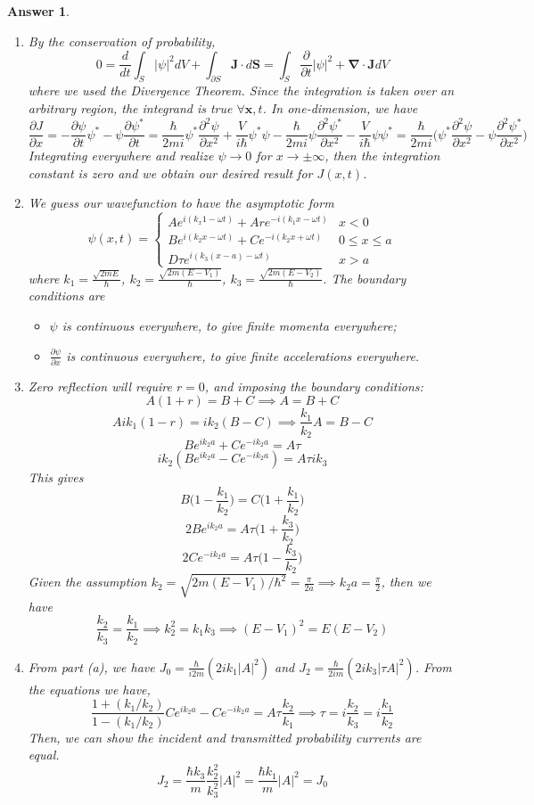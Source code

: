 \documentclass[a4paper]{article}
\newtheorem{ans}{Answer}[subsection]
\theoremstyle{new}
\begin{document}
\begin{ans}\leavevmode
\begin{enumerate}[label=(\alph*)]
\item By the conservation of probability,
$$0=\frac{d}{dt}\int_S|\psi|^2dV+\int_{\partial S}\mathbf{J}\cdot d\mathbf{S}=\int_S\frac{\partial}{\partial t}|\psi|^2+\boldsymbol{\nabla}\cdot\mathbf{J}dV$$
where we used the Divergence Theorem. Since the integration is taken over an arbitrary region, the integrand is true $\forall\mathbf{x},t$. In one-dimension, we have
$$\frac{\partial J}{\partial x}=-\frac{\partial\psi}{\partial t}\psi^*-\psi\frac{\partial\psi^*}{\partial t}=\frac{\hbar}{2mi}\psi^*\frac{\partial^2\psi}{\partial x^2}+\frac{V}{i\hbar}\psi^*\psi-\frac{\hbar}{2mi}\psi\frac{\partial^2\psi^*}{\partial x^2}-\frac{V}{i\hbar}\psi\psi^*=\frac{\hbar}{2mi}\bigg(\psi^*\frac{\partial^2\psi}{\partial x^2}-\psi\frac{\partial^2\psi^*}{\partial x^2}\bigg)$$
Integrating everywhere and realize $\psi\rightarrow0$ for $x\rightarrow\pm\infty$, then the integration constant is zero and we obtain our desired result for $J(x,t)$.
\item We guess our wavefunction to have the asymptotic form
$$\psi(x,t)=
\left\{
        \begin{array}{ll}
      Ae^{i(k_x1-\omega t)}+Are^{-i(k_1x-\omega t)} & x<0 \\
      Be^{i(k_2x-\omega t)}+Ce^{-i(k_2x+\omega t)} & 0\leq x\leq a\\
      D\tau e^{i(k_3(x-a)-\omega t)} & x>a
        \end{array}
    \right.$$
where $k_1=\frac{\sqrt{2mE}}{\hbar}$, $k_2=\frac{\sqrt{2m(E-V_1)}}{\hbar}$, $k_3=\frac{\sqrt{2m(E-V_2)}}{\hbar}$. The boundary conditions are
\begin{itemize}
    \item $\psi$ is continuous everywhere, to give finite momenta everywhere;
    \item $\frac{\partial\psi}{\partial x}$ is continuous everywhere, to give finite accelerations everywhere.
\end{itemize}
\item Zero reflection will require $r=0$, and imposing the boundary conditions:
$$A(1+r)=B+C\implies A=B+C$$
$$Aik_1(1-r)=ik_2(B-C)\implies\frac{k_1}{k_2}A=B-C$$
$$Be^{ik_2a}+Ce^{-ik_2a}=A\tau$$
$$ik_2(Be^{ik_2a}-Ce^{-ik_2a})=A\tau ik_3$$
This gives 
$$B\bigg(1-\frac{k_1}{k_2}\bigg)=C\bigg(1+\frac{k_1}{k_2}\bigg)$$
$$2Be^{ik_2a}=A\tau\bigg(1+\frac{k_3}{k_2}\bigg)$$
$$2Ce^{-ik_2a}=A\tau\bigg(1-\frac{k_3}{k_2}\bigg)$$
Given the assumption $k_2=\sqrt{2m(E-V_1)/\hbar^2}=\frac{\pi}{2a}\implies k_2a=\frac{\pi}{2}$, then we have 
$$\frac{k_2}{k_3}=\frac{k_1}{k_2}\implies k_2^2=k_1k_3\implies(E-V_1)^2=E(E-V_2)$$
\item From part (a), we have $J_0=\frac{\hbar}{i2m}(2ik_1|A|^2)$ and $J_2=\frac{\hbar}{2im}(2ik_3|\tau A|^2)$. From the equations we have,
$$\frac{1+(k_1/k_2)}{1-(k_1/k_2)}Ce^{ik_2a}-Ce^{-ik_2a}=A\tau\frac{k_2}{k_1}\implies\tau=i\frac{k_2}{k_3}=i\frac{k_1}{k_2}$$
Then, we can show the incident and transmitted probability currents are equal.
$$J_2=\frac{\hbar k_3}{m}\frac{k_2^2}{k_3^2}|A|^2=\frac{\hbar k_1}{m}|A|^2=J_0$$
\end{enumerate}
\end{ans}
\end{document}
